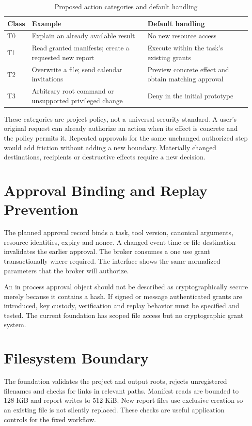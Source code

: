 \begin{table}[htbp]\centering\small
\caption{Proposed action categories and default handling}
\begin{tabularx}{\textwidth}{P{18mm}Y Y}
\toprule\textbf{Class} & \textbf{Example} & \textbf{Default handling}\\\midrule
T0 & Explain an already available result & No new resource access\\
T1 & Read granted manifests; create a requested new report & Execute within the task's existing grants\\
T2 & Overwrite a file; send calendar invitations & Preview concrete effect and obtain matching approval\\
T3 & Arbitrary root command or unsupported privileged change & Deny in the initial prototype\\\bottomrule
\end{tabularx}\end{table}

These categories are project policy, not a universal security standard. A user's original request can already authorize an action when its effect is concrete and the policy permits it. Repeated approvals for the same unchanged authorized step would add friction without adding a new boundary. Materially changed destinations, recipients or destructive effects require a new decision.

\section{Approval Binding and Replay Prevention}
The planned approval record binds a task, tool version, canonical arguments, resource identities, expiry and nonce. A changed event time or file destination invalidates the earlier approval. The broker consumes a one use grant transactionally where required. The interface shows the same normalized parameters that the broker will authorize.

An in process approval object should not be described as cryptographically secure merely because it contains a hash. If signed or message authenticated grants are introduced, key custody, verification and replay behavior must be specified and tested. The current foundation has scoped file access but no cryptographic grant system.

\section{Filesystem Boundary}
The foundation validates the project and output roots, rejects unregistered filenames and checks for links in relevant paths. Manifest reads are bounded to 128 KiB and report writes to 512 KiB. New report files use exclusive creation so an existing file is not silently replaced. These checks are useful application controls for the fixed workflow.

